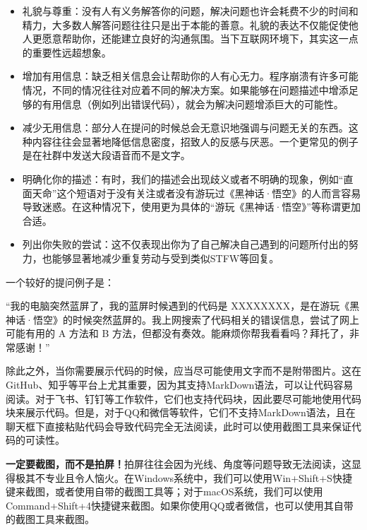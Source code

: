 \documentclass[../main.tex]{subfiles}
\begin{document}
\begin{itemize}
  \item 礼貌与尊重：没有人有义务解答你的问题，解决问题也许会耗费不少的时间和精力，大多数人解答问题往往只是出于本能的善意。礼貌的表达不仅能促使他人更愿意帮助你，还能建立良好的沟通氛围。当下互联网环境下，其实这一点的重要性远超想象。
  \item 增加有用信息：缺乏相关信息会让帮助你的人有心无力。程序崩溃有许多可能情况，不同的情况往往对应着不同的解决方案。如果能够在问题描述中增添足够的有用信息（例如列出错误代码），就会为解决问题增添巨大的可能性。
  \item 减少无用信息：部分人在提问的时候总会无意识地强调与问题无关的东西。这种内容往往会显著地降低信息密度，招致人的反感与厌恶。一个更常见的例子是在社群中发送大段语音而不是文字。
  \item 明确化你的描述：有时，我们的描述会出现歧义或者不明确的现象，例如“直面天命”这个短语对于没有关注或者没有游玩过《黑神话·悟空》的人而言容易导致迷惑。在这种情况下，使用更为具体的“游玩《黑神话·悟空》”等称谓更加合适。
  \item 列出你失败的尝试：这不仅表现出你为了自己解决自己遇到的问题所付出的努力，也能够显著地减少重复劳动与受到类似STFW等回复。
\end{itemize}

一个较好的提问例子是：

“我的电脑突然蓝屏了，我的蓝屏时候遇到的代码是 XXXXXXXX，是在游玩《黑神话·悟空》的时候突然蓝屏的。我上网搜索了代码相关的错误信息，尝试了网上可能有用的 A 方法和 B 方法，但都没有奏效。能麻烦你帮我看看吗？拜托了，非常感谢！”

除此之外，当你需要展示代码的时候，应当尽可能使用文字而不是附带图片。这在GitHub、知乎等平台上尤其重要，因为其支持MarkDown语法，可以让代码容易阅读。对于飞书、钉钉等工作软件，它们也支持代码块，因此要尽可能地使用代码块来展示代码。但是，对于QQ和微信等软件，它们不支持MarkDown语法，且在聊天框下直接粘贴代码会导致代码完全无法阅读，此时可以使用截图工具来保证代码的可读性。

\textbf{一定要截图，而不是拍屏！}拍屏往往会因为光线、角度等问题导致无法阅读，这显得极其不专业且令人恼火。在Windows系统中，我们可以使用Win+Shift+S快捷键来截图，或者使用自带的截图工具等；对于macOS系统，我们可以使用Command+Shift+4快捷键来截图。如果你使用QQ或者微信，也可以使用其自带的截图工具来截图。
\end{document}
